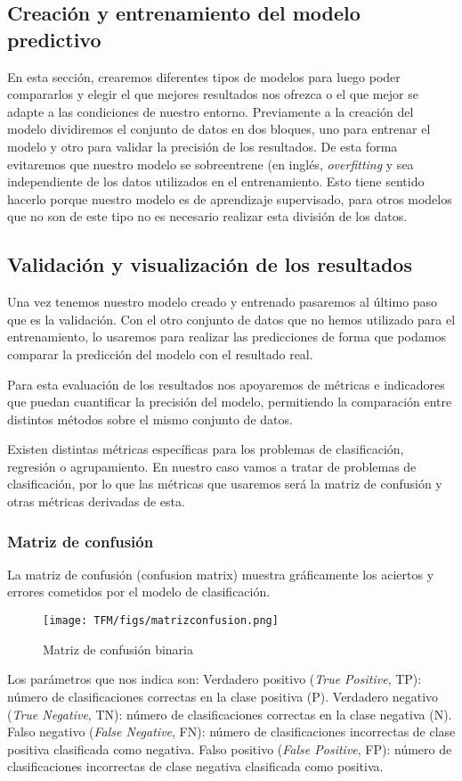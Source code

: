 \subsection{Creación y entrenamiento del modelo predictivo}
En esta sección, crearemos diferentes tipos de modelos para luego poder compararlos y elegir el que mejores resultados nos ofrezca o el que mejor se adapte a las condiciones de nuestro entorno.
Previamente a la creación del modelo dividiremos el conjunto de datos en dos bloques, uno para entrenar el modelo y otro para validar la precisión de los resultados.
De esta forma evitaremos que nuestro modelo se sobreentrene (en inglés, \textit{overfitting} y sea independiente de los datos utilizados en el entrenamiento.
Esto tiene sentido hacerlo porque nuestro modelo es de aprendizaje supervisado, para otros modelos que no son de este tipo no es necesario realizar esta división de los datos.

\subsection{Validación y visualización de los resultados}
Una vez tenemos nuestro modelo creado y entrenado pasaremos al último paso que es la validación. 
Con el otro conjunto de datos que no hemos utilizado para el entrenamiento, lo usaremos para realizar las predicciones de forma que podamos comparar la predicción del modelo con el resultado real.

Para esta evaluación de los resultados nos apoyaremos de métricas e indicadores que puedan cuantificar la precisión del modelo, permitiendo la comparación entre distintos métodos sobre el mismo conjunto de datos.

Existen distintas métricas específicas para los problemas de clasificación, regresión o agrupamiento.
En nuestro caso vamos a tratar de problemas de clasificación, por lo que las métricas que usaremos será la matriz de confusión y otras métricas derivadas de esta.

\subsubsection{Matriz de confusión}
La matriz de confusión (confusion matrix) muestra gráficamente los aciertos y errores cometidos por el modelo de clasificación. 
\begin{figure}[H]
\centerline{\texttt{[image: TFM/figs/matrizconfusion.png]}}
\caption{Matriz de confusión binaria}
\label{fig:matrizconfusion}
\end{figure}
Los parámetros que nos indica son:
Verdadero positivo (\textit{True Positive}, TP): número de clasificaciones correctas en la clase positiva (P).
Verdadero negativo (\textit{True Negative}, TN): número de clasificaciones correctas en la clase negativa (N).
Falso negativo (\textit{False Negative}, FN): número de clasificaciones incorrectas de clase positiva clasificada como negativa.
Falso positivo (\textit{False Positive}, FP): número de clasificaciones incorrectas de clase negativa clasificada como positiva.

